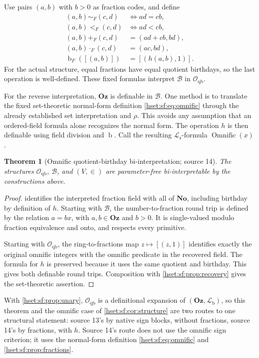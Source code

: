 \documentclass[11pt,letterpaper]{article}
\newtheorem{theorem}{Theorem}[section]
\theoremstyle{definition}
\theoremstyle{remark}
\newcommand{\No}{\mathbf{No}}
\newcommand{\bd}{\operatorname{b}}
\newcommand{\B}{\mathcal B}
\newcommand{\Oz}{\mathbf{Oz}}
\newcommand{\Lb}{\mathcal L_{\mathrm b}}
\newcommand{\Ls}{\mathcal L_{\mathrm s}}
\begin{document}
Use pairs $(a,b)$ with $b>0$ as fraction codes, and define
\begin{align*}
 (a,b)\sim_F(c,d)&\iff ad=cb,\\
 (a,b)<_F(c,d)&\iff ad<cb,\\
 (a,b)+_F(c,d)&=(ad+cb,bd),\\
 (a,b)\cdot_F(c,d)&=(ac,bd),\\
 \bd_F([(a,b)])&=[(h(a,b),1)].
\end{align*}
For the actual structure, equal fractions have equal quotient birthdays, so the
last operation is well-defined. These fixed formulas interpret $\B$ in
$\mathcal O_{\mathrm{qb}}$.

For the reverse interpretation, $\Oz$ is definable in $\B$. One method is to
translate the fixed set-theoretic normal-form definition \eqref{hset:sf:eq:omnific}
through the already established set interpretation and $\rho$. This avoids any
assumption that an ordered-field formula alone recognizes the normal form. The
operation $h$ is then definable using field division and $\bd$. Call the resulting
$\Ls$-formula $\operatorname{Omnific}(x)$.

\begin{theorem}[Omnific quotient-birthday bi-interpretation; source 14]\label{hset:sf:thm:omnificstruct}
The structures $\mathcal O_{\mathrm{qb}}$, $\B$, and $(V,\in)$ are parameter-free
bi-interpretable by the constructions above.
\end{theorem}
\begin{proof}
 identifies the interpreted fraction field with all
of $\No$, including birthday by definition of $h$. Starting with $\B$, the
number-to-fraction round trip is defined by the relation $a=bx$, with $a,b\in\Oz$
and $b>0$. It is single-valued modulo fraction equivalence and onto, and respects
every primitive.

Starting with $\mathcal O_{\mathrm{qb}}$, the ring-to-fractions map
$z\mapsto[(z,1)]$ identifies exactly the original omnific integers with the
omnific predicate in the recovered field. The formula for $h$ is preserved because
it uses the same quotient and birthday. This gives both definable round trips.
Composition with \cref{hset:sf:prop:recovery} gives the set-theoretic assertion.
\end{proof}

With \cref{hset:sf:prop:unary}, $\mathcal O_{\mathrm{qb}}$ is a definitional
expansion of $(\Oz,\Lb)$, so this theorem and the omnific case of
\cref{hset:sf:cor:structure} are two routes to one structural statement: source
13's by native sign blocks, without fractions, source 14's by fractions, with $h$.
Source 14's route does not use the omnific sign criterion; it uses the normal-form
definition \eqref{hset:sf:eq:omnific} and \cref{hset:sf:prop:fractions}.
\end{document}
